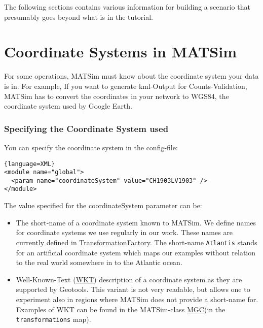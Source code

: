 The following sections contains various information for building a scenario that presumably goes beyond what is in the tutorial.

\vfill\eject
\section{Coordinate Systems in MATSim}

For  some operations, MATSim must know about the coordinate system your data  is in. For example, If you want to generate kml-Output for  Counts-Validation, MATSim has to convert the coordinates in your network  to WGS84, the coordinate system used by Google Earth.


\subsubsection{Specifying the Coordinate System used}

You can specify the coordinate system in the config-file:
\begin{lstlisting}{language=XML}
<module name="global">
  <param name="coordinateSystem" value="CH1903LV1903" />
</module>
\end{lstlisting}

The value specified for the coordinateSystem parameter can be:
\begin{itemize}
	\item The short-name of a coordinate system known to MATSim. We define  names for coordinate systems we use regularly in our work. These names  are currently defined in \href{http://matsim.svn.sourceforge.net/viewvc/matsim/matsim/trunk/src/main/java/org/matsim/core/utils/geometry/transformations/TransformationFactory.java?view=markup}{TransformationFactory}. The short-name 
\texttt{Atlantis}  stands for an artificial coordinate system which maps our examples  without relation to the real world somewhere in to the Atlantic ocean.
	\item Well-Known-Text (\href{http://www.geoapi.org/snapshot/javadoc/org/opengis/referencing/doc-files/WKT.html}{WKT})  description of a coordinate system as they are supported by Geotools.  This variant is not very readable, but allows one to experiment also in  regions where MATSim does not provide a short-name for. Examples of WKT  can be found in the MATSim-class \href{http://matsim.svn.sourceforge.net/viewvc/matsim/matsim/trunk/src/main/java/org/matsim/core/utils/geometry/geotools/MGC.java?view=markup}{MGC}(in the 
\texttt{transformations} map).
\end{itemize}

